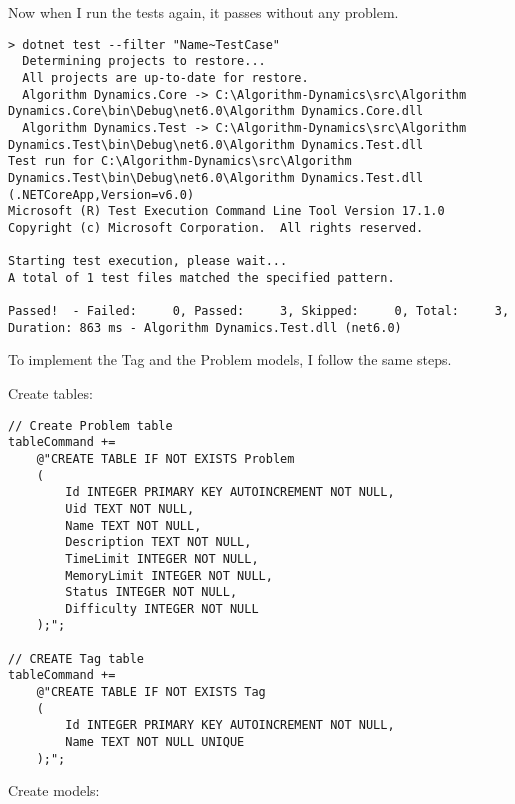 \documentclass[report.tex]{subfiles}
\begin{document}
Now when I run the tests again, it passes without any problem.

\begin{verbatim}
> dotnet test --filter "Name~TestCase"
  Determining projects to restore...
  All projects are up-to-date for restore.
  Algorithm Dynamics.Core -> C:\Algorithm-Dynamics\src\Algorithm Dynamics.Core\bin\Debug\net6.0\Algorithm Dynamics.Core.dll
  Algorithm Dynamics.Test -> C:\Algorithm-Dynamics\src\Algorithm Dynamics.Test\bin\Debug\net6.0\Algorithm Dynamics.Test.dll
Test run for C:\Algorithm-Dynamics\src\Algorithm Dynamics.Test\bin\Debug\net6.0\Algorithm Dynamics.Test.dll (.NETCoreApp,Version=v6.0)
Microsoft (R) Test Execution Command Line Tool Version 17.1.0
Copyright (c) Microsoft Corporation.  All rights reserved.

Starting test execution, please wait...
A total of 1 test files matched the specified pattern.

Passed!  - Failed:     0, Passed:     3, Skipped:     0, Total:     3, Duration: 863 ms - Algorithm Dynamics.Test.dll (net6.0)
\end{verbatim}

To implement the Tag and the Problem models, I follow the same steps.

Create tables:

\begin{verbatim}
// Create Problem table
tableCommand +=
    @"CREATE TABLE IF NOT EXISTS Problem
    (
        Id INTEGER PRIMARY KEY AUTOINCREMENT NOT NULL,
        Uid TEXT NOT NULL,
        Name TEXT NOT NULL,
        Description TEXT NOT NULL,
        TimeLimit INTEGER NOT NULL,
        MemoryLimit INTEGER NOT NULL,
        Status INTEGER NOT NULL,
        Difficulty INTEGER NOT NULL
    );";

// CREATE Tag table
tableCommand +=
    @"CREATE TABLE IF NOT EXISTS Tag
    (
        Id INTEGER PRIMARY KEY AUTOINCREMENT NOT NULL,
        Name TEXT NOT NULL UNIQUE
    );";
\end{verbatim}

Create models:
\end{document}

